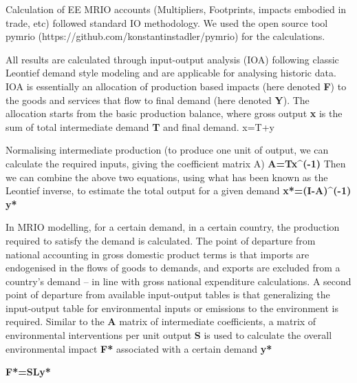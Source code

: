 Calculation of EE MRIO accounts (Multipliers, Footprints, impacts embodied in trade, etc) followed
standard IO methodology. We used the open source tool pymrio (https://github.com/konstantinstadler/pymrio) for the calculations.

All results are  calculated through input-output analysis (IOA) following classic Leontief demand style modeling and are applicable for analysing historic data. IOA is essentially an allocation of production based impacts (here denoted \textbf{F}) to the goods and services that flow to final demand (here denoted \textbf{Y}). The allocation starts from the basic production balance, where gross output \textbf{x} is the sum of total intermediate demand \textbf{T} and final demand. x=T+y

Normalising intermediate production (to produce one unit of output, we can calculate the required inputs, giving the coefficient matrix A)
\textbf{A=Tx^(-1) }
Then we can combine the above two equations, using what has been known as the Leontief inverse, to estimate the total output for a given demand
\textbf{x*=(I-A)^(-1) y*}

In MRIO modelling, for a certain demand, in a certain country, the production required to satisfy the demand is calculated. The point of departure from national accounting in gross domestic product terms is that imports are endogenised in the flows of goods to demands, and exports are excluded from a country’s demand – in line with gross national expenditure calculations. A second point of departure from available input-output tables is that generalizing the input-output table for environmental inputs or emissions to the environment is required. Similar to the \textbf{A} matrix of intermediate coefficients, a matrix of environmental interventions per unit output \textbf{S} is used to calculate the overall environmental impact \textbf{F*} associated with a certain demand \textbf{y*} 

\textbf{F*=SLy*}
